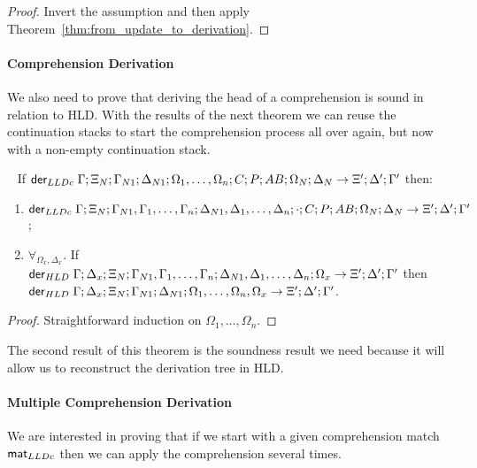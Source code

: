 \begin{proof}
Invert the assumption and then apply Theorem~\ref{thm:from_update_to_derivation}.
\end{proof}


\paragraph{Comprehension Derivation}

We also need to prove that deriving the head of a comprehension is sound in
relation to HLD.  With the results of the next theorem we can reuse the
continuation stacks to start the comprehension process all over again, but now
with a non-empty continuation stack.

\begin{theorem}\label{thm:comprehension_derivation}
~\newline
If $\mathsf{der}_{LLDc} \; \Gamma; \Xi_N; \Gamma_{N1}; \Delta_{N1}; \Omega_1, \dotsc, \Omega_n; C; P;
AB; \Omega_N; \Delta_N \rightarrow \Xi'; \Delta'; \Gamma'$ then:

\begin{enumerate}
   \item $\mathsf{der}_{LLDc} \; \Gamma; \Xi_N; \Gamma_{N1}, \Gamma_1, \dotsc, \Gamma_n; \Delta_{N1},
   \Delta_1, \dotsc, \Delta_n; \cdot; C; P; AB; \Omega_N; \Delta_N \rightarrow
   \Xi'; \Delta'; \Gamma'$;

   \item $\forall_{\Omega_x, \Delta_x}.$ If $\mathsf{der}_{HLD} \; \Gamma; \Delta_x; \Xi_N;
   \Gamma_{N1}, \Gamma_1, \dotsc, \Gamma_n; \Delta_{N1}, \Delta_1, \dotsc,
   \Delta_n; \Omega_x \rightarrow \Xi'; \Delta'; \Gamma'$ then \linebreak $\mathsf{der}_{HLD} \;
   \Gamma; \Delta_x; \Xi_N; \Gamma_{N1}; \Delta_{N1}; \Omega_1, \dotsc, \Omega_n, \Omega_x \rightarrow \Xi'; \Delta'; \Gamma'$.

\end{enumerate}
\end{theorem}

\begin{proof}
Straightforward induction on $\Omega_1, \dotsc, \Omega_n$.
\end{proof}

The second result of this theorem is the soundness result we need because it will allow us to reconstruct the derivation tree in HLD.


\paragraph{Multiple Comprehension Derivation} We are interested in proving that
if we start with a given comprehension match $\mathsf{mat}_{LLDc}$ then we can apply the
comprehension several times.

